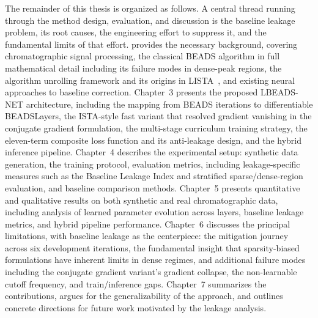 The remainder of this thesis is organized as follows. A central thread running through the method design, evaluation, and discussion is the baseline leakage problem, its root causes, the engineering effort to suppress it, and the fundamental limits of that effort.
%
 provides the necessary background, covering chromatographic signal processing, the classical BEADS algorithm in full mathematical detail including its failure modes in dense-peak regions, the algorithm unrolling framework and its origins in LISTA~\cite{gregor2010lista}, and existing neural approaches to baseline correction.
%
Chapter~3 presents the proposed LBEADS-NET architecture, including the mapping from BEADS iterations to differentiable BEADSLayers, the ISTA-style fast variant that resolved gradient vanishing in the conjugate gradient formulation, the multi-stage curriculum training strategy, the eleven-term composite loss function and its anti-leakage design, and the hybrid inference pipeline.
%
Chapter~4 describes the experimental setup: synthetic data generation, the training protocol, evaluation metrics, including leakage-specific measures such as the Baseline Leakage Index and stratified sparse/dense-region evaluation, and baseline comparison methods.
%
Chapter~5 presents quantitative and qualitative results on both synthetic and real chromatographic data, including analysis of learned parameter evolution across layers, baseline leakage metrics, and hybrid pipeline performance.
%
Chapter~6 discusses the principal limitations, with baseline leakage as the centerpiece: the mitigation journey across six development iterations, the fundamental insight that sparsity-biased formulations have inherent limits in dense regimes, and additional failure modes including the conjugate gradient variant's gradient collapse, the non-learnable cutoff frequency, and train/inference gaps.
%
Chapter~7 summarizes the contributions, argues for the generalizability of the approach, and outlines concrete directions for future work motivated by the leakage analysis.
